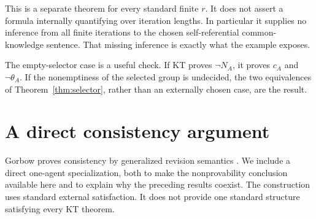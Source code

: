 \documentclass[11pt]{article}
\begin{document}
This is a separate theorem for every standard finite $r$. It does not
assert a formula internally quantifying over iteration lengths. In
particular it supplies no inference from all finite iterations to the
chosen self-referential common-knowledge sentence. That missing
inference is exactly what the example exposes.

The empty-selector case is a useful check. If KT proves $\neg N_A$,
it proves $c_A$ and $\neg\theta_A$. If the nonemptiness of the selected
group is undecided, the two equivalences of Theorem~\ref{thm:selector},
rather than an externally chosen case, are the result.

\section{A direct consistency argument}

Gorbow proves consistency by generalized revision semantics
\cite[Theorem~15 and Corollary~16]{Gorbow}. We include a direct
one-agent specialization, both to make the nonprovability conclusion
available here and to explain why the preceding results coexist.
The construction uses standard external satisfaction. It does not
provide one standard structure satisfying every KT theorem.
\end{document}
